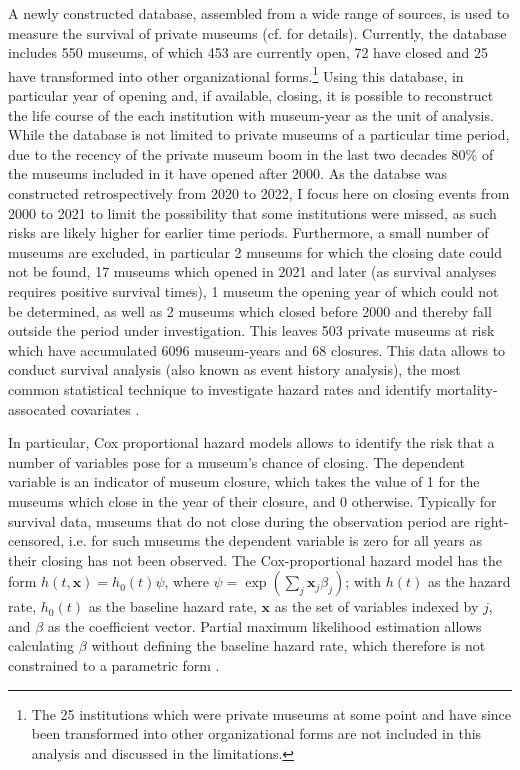 \documentclass[12pt]{article}
\begin{document}
A newly constructed database, assembled from a wide range of sources, is used to measure the survival of private museums (cf. \textcite{Velthuis_etal_2023_boom} for details).
Currently, the database includes 550 museums, of which 453 are currently open, 72 have closed and 25 have transformed into other organizational forms.\footnote{The 25 institutions which were private museums at some point and have since been transformed into other organizational forms are not included in this analysis and discussed in the limitations.}
Using this database, in particular year of opening and, if available, closing, it is possible to reconstruct the life course of the each institution with museum-year as the unit of analysis.
While the database is not limited to private museums of a particular time period, due to the recency of the private museum boom in the last two decades 80\% of the museums included in it have opened after 2000.
As the databse was constructed retrospectively from 2020 to 2022, I focus here on closing events from 2000 to 2021 to limit the possibility that some institutions were missed, as such risks are likely higher for earlier time periods.
Furthermore, a small number of museums are excluded, in particular 2 museums for which the closing date could not be found, 17 museums which opened in 2021 and later (as survival analyses requires positive survival times), 1 museum the opening year of which could not be determined, as well as 2 museums which closed before 2000 and thereby fall outside the period under investigation.
This leaves 503 private museums at risk which have accumulated 6096 museum-years and 68 closures.
This data allows to conduct survival analysis (also known as event history analysis), the most common statistical technique to investigate hazard rates and identify mortality-assocated covariates \parencite{Moore_2015_survival,Allison_2014_event}.




In particular, Cox proportional hazard models allows to identify the risk that a number of variables pose for a museum's chance of closing. 
The dependent variable is an indicator of museum closure, which takes the value of 1 for the museums which close in the year of their closure, and 0 otherwise.
Typically for survival data, museums that do not close during the observation period are right-censored, i.e. for such museums the dependent variable is zero for all years as their closing has not been observed.
The Cox-proportional hazard model has the form \(h(t,\mathbf{x}) = h_0(t) \psi\), where \(\psi = \exp(\sum_{j} \mathbf{x}_j \beta_j)\); with \(h(t)\) as the hazard rate, \(h_0(t)\) as the baseline hazard rate, \(\mathbf{x}\) as the set of variables indexed by \(j\), and \(\beta\) as the coefficient vector.
Partial maximum likelihood estimation allows calculating \(\beta\) without defining the baseline hazard rate, which therefore is not constrained to a parametric form \parencite{Moore_2015_survival}.
\end{document}
